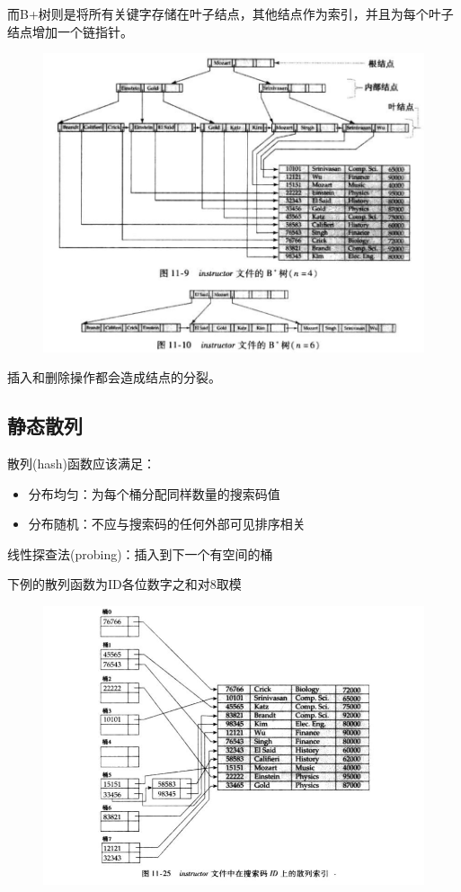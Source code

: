 而B+树则是将所有关键字存储在叶子结点，其他结点作为索引，并且为每个叶子结点增加一个链指针。
\begin{figure}[H]
\centering
\includegraphics[width=0.6\linewidth]{fig/bp-tree.png}
\end{figure}

插入和删除操作都会造成结点的分裂。

\subsection{静态散列}
散列(hash)函数应该满足：
\begin{itemize}
	\item 分布均匀：为每个桶分配同样数量的搜索码值
	\item 分布随机：不应与搜索码的任何外部可见排序相关
\end{itemize}

线性探查法(probing)：插入到下一个有空间的桶

下例的散列函数为ID各位数字之和对8取模
\begin{figure}[H]
\centering
\includegraphics[width=\linewidth]{fig/hash_index.png}
\end{figure}

